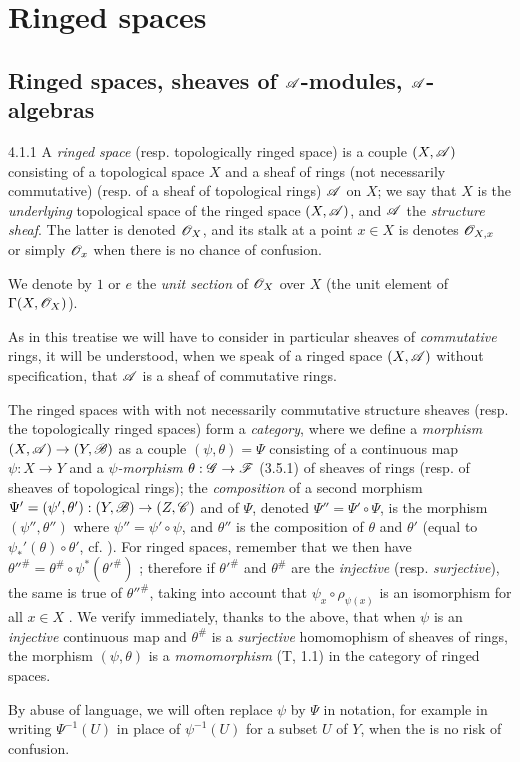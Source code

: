 \documentclass[10pt,oneside]{book}
\begin{document}
\section{Ringed spaces}
\label{0-prelim-4}

\subsection{Ringed spaces, sheaves of $\mathscr{A}$-modules, $\mathscr{A}$-algebras}
\label{0-prelim-4.1}

\begin{env}{4.1.1}
\label{env-0.4.1.1}
A \emph{ringed space} (resp. topologically ringed space) is a couple $(X,\mathscr{A})$
consisting of a topological space $X$ and a sheaf of rings (not necessarily commutative)
(resp. of a sheaf of topological rings) $\mathscr{A}$ on $X$; we say that $X$ is the
\emph{underlying} topological space of the ringed space $(X,\mathscr{A})$, and $\mathscr{A}$
the \emph{structure sheaf}. The latter is denoted $\mathscr{O}_X$, and its stalk at a point
$x\in X$ is denotes $\mathscr{O}_{X,x}$ or simply $\mathscr{O}_x$ when there is no chance of confusion.

We denote by $1$ or $e$ the \emph{unit section} of $\mathscr{O}_X$ over $X$ (the unit element
of $\Gamma(X,\mathscr{O}_X)$).

As in this treatise we will have to consider in particular sheaves of \emph{commutative}
rings, it will be understood, when we speak of a ringed space $(X,\mathscr{A})$ without
specification, that $\mathscr{A}$ is a sheaf of commutative rings.

The ringed spaces with with not necessarily commutative structure sheaves
(resp. the topologically ringed spaces) form a \emph{category}, where we define
a \emph{morphism} $(X,\mathscr{A})\to(Y,\mathscr{B})$ as a couple $(\psi,\theta)=\Psi$
consisting of a continuous map $\psi:X\to Y$ and a \emph{$\psi$-morphism}
$\theta:\mathscr{G}\to\mathscr{F}$ (3.5.1) of sheaves of rings (resp. of sheaves of
topological rings); the \emph{composition} of a second morphism
$\Psi'=(\psi',\theta'):(Y,\mathscr{B})\to(Z,\mathscr{C})$ and of $\Psi$, denoted
$\Psi''=\Psi'\circ\Psi$, is the morphism $(\psi'',\theta'')$ where $\psi''=\psi'\circ\psi$,
and $\theta''$ is the composition of $\theta$ and $\theta'$ (equal to
$\psi_*'(\theta)\circ\theta'$, cf. ). For ringed spaces, remember that we
then have ${\theta''}^\#=\theta^\#\circ\psi^*({\theta'}^\#)$ ; therefore
if ${\theta'}^\#$ and $\theta^\#$ are the \emph{injective} (resp. \emph{surjective}),
the same is true of ${\theta''}^\#$, taking into account that $\psi_x\circ\rho_{\psi(x)}$
is an isomorphism for all $x\in X$ . We verify immediately, thanks to the
above, that when $\psi$ is an \emph{injective} continuous map and $\theta^\#$ is
a \emph{surjective} homomophism of sheaves of rings, the morphism $(\psi,\theta)$ is
a \emph{momomorphism} (T, 1.1) in the category of ringed spaces.

By abuse of language, we will often replace $\psi$ by $\Psi$ in notation, for
example in writing $\Psi^{-1}(U)$ in place of $\psi^{-1}(U)$ for a subset $U$ of $Y$,
when the is no risk of confusion.
\end{env}
\end{document}
